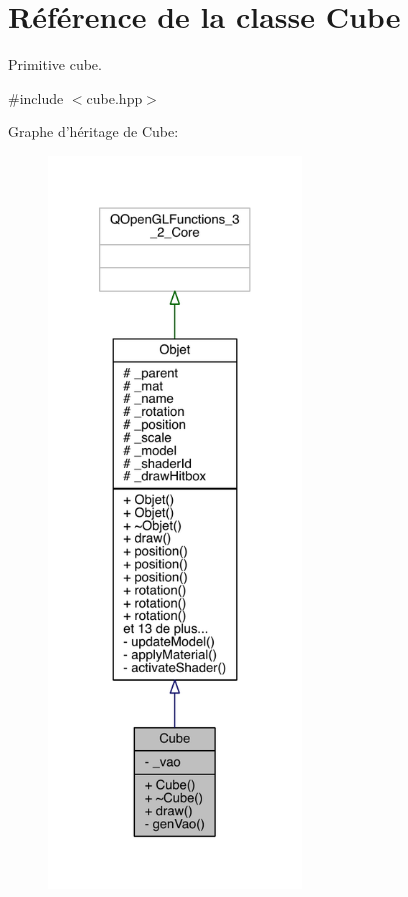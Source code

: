 \hypertarget{class_cube}{\section{Référence de la classe Cube}
\label{class_cube}
}


Primitive cube.  




{\ttfamily \#include $<$cube.\+hpp$>$}



Graphe d'héritage de Cube\+:
\nopagebreak
\begin{figure}[H]
\begin{center}
\leavevmode
\includegraphics[height=550pt]{class_cube__inherit__graph}
\end{center}
\end{figure}


